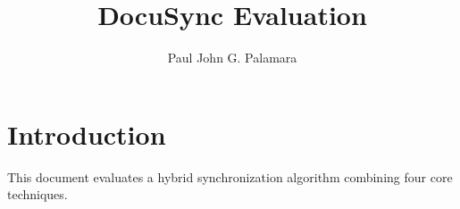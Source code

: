 \documentclass{article}
\title{DocuSync Evaluation}
\author{Paul John G. Palamara}
\begin{document}
\maketitle
\section{Introduction}
This document evaluates a hybrid 
synchronization algorithm combining 
four core techniques.
\end{document}
